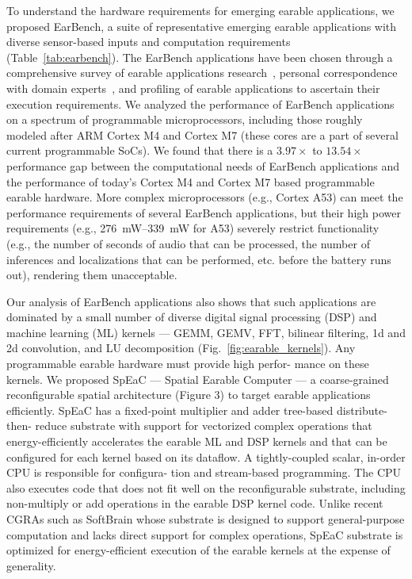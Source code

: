 To understand the hardware requirements for emerging earable applications, we
proposed EarBench, a suite of representative emerging earable applications with
diverse sensor-based inputs and computation requirements
(Table~\ref{tab:earbench}). The EarBench applications have been chosen through
a comprehensive survey of earable applications research~\cite{}, personal
correspondence with domain experts~\cite{}, and profiling of earable
applications to ascertain their execution requirements. We analyzed the
performance of EarBench applications on a spectrum of programmable
microprocessors, including those roughly modeled after ARM Cortex M4 and Cortex
M7 (these cores are a part of several current programmable SoCs). We found that
there is a \(3.97\times\) to \(13.54\times\) performance gap between the
computational needs of EarBench applications and the performance of today's
Cortex M4 and Cortex M7 based programmable earable hardware. More complex
microprocessors (e.g., Cortex A53) can meet the performance requirements of
several EarBench applications, but their high power requirements (e.g.,
\SIrange{276}{339}{\milli\watt} for A53) severely restrict functionality (e.g.,
the number of seconds of audio that can be processed, the number of inferences
and localizations that can be performed, etc. before the battery runs out),
rendering them unacceptable.

Our analysis of EarBench applications also shows that such applications are
dominated by a small number of diverse digital signal processing (DSP) and
machine learning (ML) kernels --- GEMM, GEMV, FFT, bilinear filtering, 1d and
2d convolution, and LU decomposition (Fig.~\ref{fig:earable_kernels}). Any
programmable earable hardware must provide high perfor- mance on these kernels.
We proposed SpEaC --- Spatial Earable Computer --- a coarse-grained
reconfigurable spatial architecture (Figure 3) to target earable applications
efficiently. SpEaC has a fixed-point multiplier and adder tree-based
distribute-then- reduce substrate with support for vectorized complex
operations that energy-efficiently accelerates the earable ML and DSP kernels
and that can be configured for each kernel based on its dataflow. A
tightly-coupled scalar, in-order CPU is responsible for configura- tion and
stream-based programming. The CPU also executes code that does not fit well on
the reconfigurable substrate, including non-multiply or add operations in the
earable DSP kernel code. Unlike recent CGRAs such as SoftBrain\cite{} whose
substrate is designed to support general-purpose computation and lacks direct
support for complex operations, SpEaC substrate is optimized for
energy-efficient execution of the earable kernels at the expense of generality.

